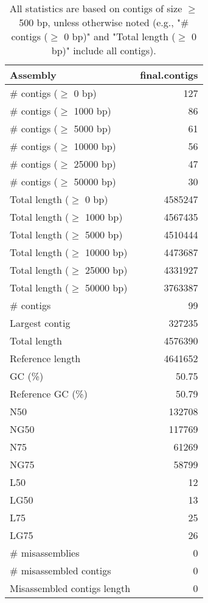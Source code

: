 \documentclass[12pt,a4paper]{article}
\begin{document}
\begin{table}[ht]
\begin{center}
\caption{All statistics are based on contigs of size $\geq$ 500 bp, unless otherwise noted (e.g., "\# contigs ($\geq$ 0 bp)" and "Total length ($\geq$ 0 bp)" include all contigs).}
\begin{tabular}{|l*{1}{|r}|}
\hline
Assembly & final.contigs \\ \hline
\# contigs ($\geq$ 0 bp) & 127 \\ \hline
\# contigs ($\geq$ 1000 bp) & 86 \\ \hline
\# contigs ($\geq$ 5000 bp) & 61 \\ \hline
\# contigs ($\geq$ 10000 bp) & 56 \\ \hline
\# contigs ($\geq$ 25000 bp) & 47 \\ \hline
\# contigs ($\geq$ 50000 bp) & 30 \\ \hline
Total length ($\geq$ 0 bp) & 4585247 \\ \hline
Total length ($\geq$ 1000 bp) & 4567435 \\ \hline
Total length ($\geq$ 5000 bp) & 4510444 \\ \hline
Total length ($\geq$ 10000 bp) & 4473687 \\ \hline
Total length ($\geq$ 25000 bp) & 4331927 \\ \hline
Total length ($\geq$ 50000 bp) & 3763387 \\ \hline
\# contigs & 99 \\ \hline
Largest contig & 327235 \\ \hline
Total length & 4576390 \\ \hline
Reference length & 4641652 \\ \hline
GC (\%) & 50.75 \\ \hline
Reference GC (\%) & 50.79 \\ \hline
N50 & 132708 \\ \hline
NG50 & 117769 \\ \hline
N75 & 61269 \\ \hline
NG75 & 58799 \\ \hline
L50 & 12 \\ \hline
LG50 & 13 \\ \hline
L75 & 25 \\ \hline
LG75 & 26 \\ \hline
\# misassemblies & 0 \\ \hline
\# misassembled contigs & 0 \\ \hline
Misassembled contigs length & 0 \\ \hline

\end{tabular}
\end{center}
\end{table}
\end{document}
